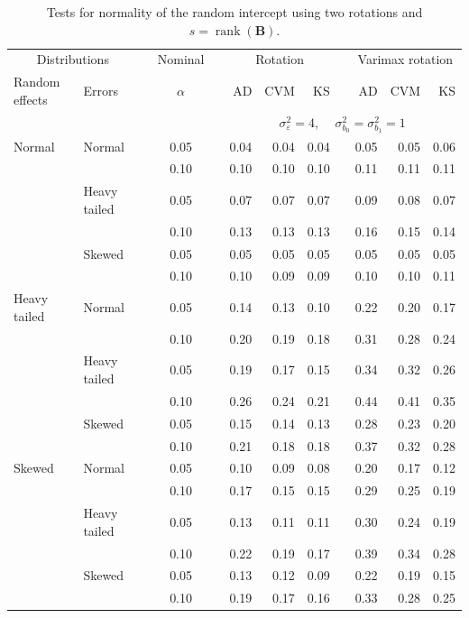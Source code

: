 \documentclass[12pt]{article} %
\DeclareMathOperator{\rank}{rank}
\begin{document}
\begin{table}[ht]
\caption{Tests for normality of the random intercept using two rotations and $s = \rank(\bm{B})$.}
\begin{scriptsize}
\begin{center}
\begin{tabular}{ll p{.1cm} c p{.1cm} rrr p{.1cm} rrr}
  \hline
  \multicolumn{2}{c}{Distributions}& & Nominal & &  \multicolumn{3}{c}{Rotation} & & \multicolumn{3}{c}{Varimax rotation} \\ \cline{1-2} \cline{6-8} \cline{10-12}   
  Random effects & Errors & & $\alpha$ & & AD & CVM & KS & & AD & CVM & KS \\ 
   \hline
& && && \multicolumn{7}{c}{$\sigma_{\varepsilon}^2 = 4$, \ \ $\sigma_{b_0}^2 = \sigma_{b_1}^2 = 1$} \\ \cline{6-12}
Normal       & Normal       && 0.05 &&   0.04 & 0.04 & 0.04 && 0.05 & 0.05 & 0.06 \\ 
             &              && 0.10 &&   0.10 & 0.10 & 0.10 && 0.11 & 0.11 & 0.11 \\ 
             & Heavy tailed && 0.05 &&   0.07 & 0.07 & 0.07 && 0.09 & 0.08 & 0.07 \\ 
             &              && 0.10 &&   0.13 & 0.13 & 0.13 && 0.16 & 0.15 & 0.14 \\ 
             & Skewed       && 0.05 &&   0.05 & 0.05 & 0.05 && 0.05 & 0.05 & 0.05 \\ 
             &              && 0.10 &&   0.10 & 0.09 & 0.09 && 0.10 & 0.10 & 0.11 \\ 
Heavy tailed & Normal       && 0.05 &&   0.14 & 0.13 & 0.10 && 0.22 & 0.20 & 0.17 \\ 
             &              && 0.10 &&   0.20 & 0.19 & 0.18 && 0.31 & 0.28 & 0.24 \\ 
             & Heavy tailed && 0.05 &&   0.19 & 0.17 & 0.15 && 0.34 & 0.32 & 0.26 \\ 
             &              && 0.10 &&   0.26 & 0.24 & 0.21 && 0.44 & 0.41 & 0.35 \\ 
             & Skewed       && 0.05 &&   0.15 & 0.14 & 0.13 && 0.28 & 0.23 & 0.20 \\ 
             &              && 0.10 &&   0.21 & 0.18 & 0.18 && 0.37 & 0.32 & 0.28 \\ 
Skewed       & Normal       && 0.05 &&   0.10 & 0.09 & 0.08 && 0.20 & 0.17 & 0.12 \\ 
             &              && 0.10 &&   0.17 & 0.15 & 0.15 && 0.29 & 0.25 & 0.19 \\ 
             & Heavy tailed && 0.05 &&   0.13 & 0.11 & 0.11 && 0.30 & 0.24 & 0.19 \\ 
             &              && 0.10 &&   0.22 & 0.19 & 0.17 && 0.39 & 0.34 & 0.28 \\ 
             & Skewed       && 0.05 &&   0.13 & 0.12 & 0.09 && 0.22 & 0.19 & 0.15 \\ 
             &              && 0.10 &&   0.19 & 0.17 & 0.16 && 0.33 & 0.28 & 0.25 \\ 


\end{tabular}
\end{center}
\end{scriptsize}
\end{table}
\end{document}
